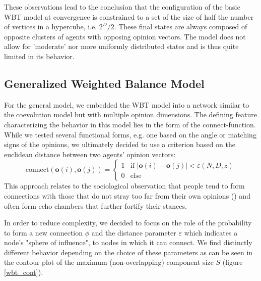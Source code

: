 \documentclass[11pt]{article}
\begin{document}
These observations lead to the conclusion that the configuration of the basic WBT model at convergence is constrained to a set of the size of half the number of vertices in a hypercube, i.e. $2^D/2$. These final states are always composed of opposite clusters of agents with opposing opinion vectors. The model does not allow for 'moderate' nor more uniformly distributed states and is thus quite limited in its behavior.

\subsection{Generalized Weighted Balance Model}
For the general model, we embedded the WBT model into a network similar to the coevolution model but with multiple opinion dimensions. The defining feature characterizing the behavior in this model lies in the form of the $\text{connect}$-function. While we tested several functional forms, e.g. one based on the angle or matching signs of the opinions, we ultimately decided to use a criterion based on the euclidean distance between two agents' opinion vectors:
\[
\text{connect}( \mathbf{o}(i), \textbf{o}(j)) = 
 \begin{cases} 1 &\mbox{if } |  \mathbf{o}(i) - \textbf{o}(j)| < \varepsilon(N,D,z) \\
0 & \mbox{else } \end{cases}
\]
This approach relates to the sociological observation that people tend to form connections with those that do not stray too far from their own opinions (\citet{bahns2017similarity}) and often form echo chambers that further fortify their stances.  

In order to reduce complexity, we decided to focus on the role of the probability to form a new connection $\phi$ and the distance parameter $\varepsilon$ which indicates a node's "sphere of influence", to nodes in which it can connect. We find distinctly different behavior depending on the choice of these parameters as can be seen in the contour plot of the maximum (non-overlapping) component size $S$ (figure \ref{wbt_cont}). 
\end{document}
